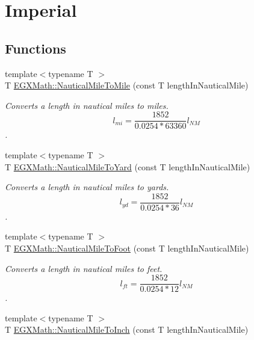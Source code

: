 \hypertarget{group___e_g_x_math-_conversions-_length_conversions-_nautical-_nautical_mile-_imperial}{}\section{Imperial}
\label{group___e_g_x_math-_conversions-_length_conversions-_nautical-_nautical_mile-_imperial}
\subsection*{Functions}
\begin{DoxyCompactItemize}
\item 
{\footnotesize template$<$typename T $>$ }\\T \mbox{\hyperlink{group___e_g_x_math-_conversions-_length_conversions-_nautical-_nautical_mile-_imperial_ga9be4e73b064274bd79a406d7ed69d21f}{E\+G\+X\+Math\+::\+Nautical\+Mile\+To\+Mile}} (const T length\+In\+Nautical\+Mile)
\begin{DoxyCompactList}\small\item\em Converts a length in nautical miles to miles. \[ l_{mi}=\frac{1852}{0.0254 * 63360} l_{NM} \]. \end{DoxyCompactList}\item 
{\footnotesize template$<$typename T $>$ }\\T \mbox{\hyperlink{group___e_g_x_math-_conversions-_length_conversions-_nautical-_nautical_mile-_imperial_ga649c499537b8934186bab8dcdee6d45e}{E\+G\+X\+Math\+::\+Nautical\+Mile\+To\+Yard}} (const T length\+In\+Nautical\+Mile)
\begin{DoxyCompactList}\small\item\em Converts a length in nautical miles to yards. \[ l_{yd}= \frac{1852}{0.0254 * 36}l_{NM} \]. \end{DoxyCompactList}\item 
{\footnotesize template$<$typename T $>$ }\\T \mbox{\hyperlink{group___e_g_x_math-_conversions-_length_conversions-_nautical-_nautical_mile-_imperial_ga5c74e872b454cc243bb0d77f0d8f76a1}{E\+G\+X\+Math\+::\+Nautical\+Mile\+To\+Foot}} (const T length\+In\+Nautical\+Mile)
\begin{DoxyCompactList}\small\item\em Converts a length in nautical miles to feet. \[ l_{ft}= \frac{1852}{0.0254 * 12} l_{NM} \]. \end{DoxyCompactList}\item 
{\footnotesize template$<$typename T $>$ }\\T \mbox{\hyperlink{group___e_g_x_math-_conversions-_length_conversions-_nautical-_nautical_mile-_imperial_ga5ec58ed7dbd23bcfb8290e1e476f354b}{E\+G\+X\+Math\+::\+Nautical\+Mile\+To\+Inch}} (const T length\+In\+Nautical\+Mile)

\end{DoxyCompactItemize}
